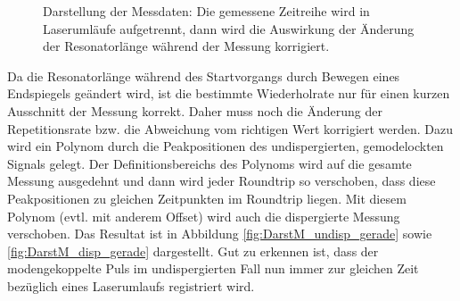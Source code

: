 \documentclass[bachelor,       %
               twoside,        %
               BCOR10mm,       %
               liststotoc,nomtotoc,bibtotoc, %
               english,ngerman, %
               final,          %
               ]{GAUBM}
\begin{document}
\begin{figure}[!htb]
   \hfill
   \caption{Darstellung der Messdaten: Die gemessene Zeitreihe wird in Laserumläufe aufgetrennt, dann wird die Auswirkung der Änderung der Resonatorlänge während der Messung korrigiert.}
   \label{fig:MessdatenDarstellung}
\end{figure}
\clearpage
Da die Resonatorlänge während des Startvorgangs durch Bewegen eines Endspiegels geändert wird, ist die bestimmte Wiederholrate nur für einen kurzen Ausschnitt der Messung korrekt.
Daher muss noch die Änderung der Repetitionsrate bzw. die Abweichung vom richtigen Wert korrigiert werden.
Dazu wird ein Polynom durch die Peakpositionen des undispergierten, gemodelockten Signals gelegt. Der Definitionsbereichs des Polynoms wird auf die gesamte Messung ausgedehnt und dann wird jeder Roundtrip so verschoben, dass diese Peakpositionen zu gleichen Zeitpunkten im Roundtrip liegen.
Mit diesem Polynom (evtl. mit anderem Offset) wird auch die dispergierte Messung verschoben.
Das Resultat ist in Abbildung \ref{fig:DarstM_undisp_gerade} sowie \ref{fig:DarstM_disp_gerade} dargestellt.
Gut zu erkennen ist, dass der modengekoppelte Puls im undispergierten Fall nun immer zur gleichen Zeit bezüglich eines Laserumlaufs registriert wird.
\end{document}
